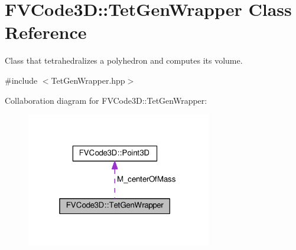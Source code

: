 \hypertarget{classFVCode3D_1_1TetGenWrapper}{}\section{F\+V\+Code3D\+:\+:Tet\+Gen\+Wrapper Class Reference}
\label{classFVCode3D_1_1TetGenWrapper}


Class that tetrahedralizes a polyhedron and computes its volume.  




{\ttfamily \#include $<$Tet\+Gen\+Wrapper.\+hpp$>$}



Collaboration diagram for F\+V\+Code3D\+:\+:Tet\+Gen\+Wrapper\+:
\nopagebreak
\begin{figure}[H]
\begin{center}
\leavevmode
\includegraphics[width=229pt]{classFVCode3D_1_1TetGenWrapper__coll__graph}
\end{center}
\end{figure}
